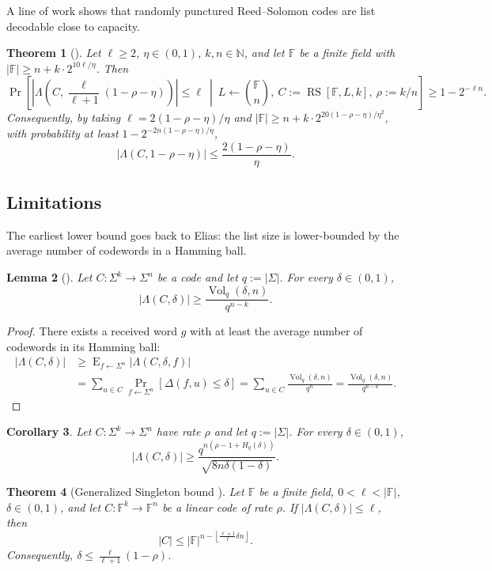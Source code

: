 \documentclass[11pt]{article}
\theoremstyle{plain}
\newtheorem{theorem}{Theorem}[section]
\newtheorem{lemma}[theorem]{Lemma}
\newtheorem{corollary}[theorem]{Corollary}
\theoremstyle{definition}
\newcommand{\F}{\mathbb{F}}
\newcommand{\N}{\mathbb{N}}
\newcommand{\RS}[3]{\operatorname{RS}[#1,#2,#3]}
\newcommand{\floor}[1]{\left\lfloor #1\right\rfloor}
\newcommand{\abs}[1]{\left|#1\right|}
\DeclareMathOperator{\Vol}{Vol}
\DeclareMathOperator*{\Prb}{Pr}
\DeclareMathOperator*{\E}{E}
\begin{document}
A line of work shows that randomly punctured Reed--Solomon codes are list decodable close to capacity.

\begin{theorem}[\cite{AGL24}]
Let $\ell\ge2$, $\eta\in(0,1)$, $k,n\in\N$, and let $\F$ be a finite field with $\abs{\F}\ge n+k\cdot 2^{10\ell/\eta}$. Then
\[
\Prb\left[
\left|\Lambda\left(C,\frac{\ell}{\ell+1}(1-\rho-\eta)\right)\right|\le \ell
\ \middle|\
 L\leftarrow \binom{\F}{n},\ C:=\RS{\F}{L}{k},\ \rho:=k/n
\right]
\ge 1-2^{-\ell n}.
\]
Consequently, by taking $\ell=2(1-\rho-\eta)/\eta$ and $\abs{\F}\ge n+k\cdot2^{20(1-\rho-\eta)/\eta^2}$, with probability at least $1-2^{-2n(1-\rho-\eta)/\eta}$,
\[
  \abs{\Lambda(C,1-\rho-\eta)}\le \frac{2(1-\rho-\eta)}{\eta}.
\]
\end{theorem}

\subsection{Limitations}

The earliest lower bound goes back to Elias: the list size is lower-bounded by the average number of codewords in a Hamming ball.

\begin{lemma}[\cite{Eli57}]
Let $C:\Sigma^k\to\Sigma^n$ be a code and let $q:=\abs{\Sigma}$. For every $\delta\in(0,1)$,
\[
  \abs{\Lambda(C,\delta)}\ge \frac{\Vol_q(\delta,n)}{q^{n-k}}.
\]
\end{lemma}

\begin{proof}
There exists a received word $g$ with at least the average number of codewords in its Hamming ball:
\[
\begin{aligned}
\abs{\Lambda(C,\delta)}
&\ge \E_{f\leftarrow\Sigma^n}\abs{\Lambda(C,\delta,f)} \\
&=\sum_{u\in C}\Prb_{f\leftarrow\Sigma^n}[\Delta(f,u)\le\delta]
=\sum_{u\in C}\frac{\Vol_q(\delta,n)}{q^n}
=\frac{\Vol_q(\delta,n)}{q^{n-k}}.
\end{aligned}
\]
\end{proof}

\begin{corollary}
Let $C:\Sigma^k\to\Sigma^n$ have rate $\rho$ and let $q:=\abs{\Sigma}$. For every $\delta\in(0,1)$,
\[
  \abs{\Lambda(C,\delta)}\ge
  \frac{q^{n(\rho-1+H_q(\delta))}}{\sqrt{8n\delta(1-\delta)}}.
\]
\end{corollary}

\begin{theorem}[Generalized Singleton bound \cite{ST20}]
Let $\F$ be a finite field, $0<\ell<\abs{\F}$, $\delta\in(0,1)$, and let $C:\F^k\to\F^n$ be a linear code of rate $\rho$. If $\abs{\Lambda(C,\delta)}\le\ell$, then
\[
  \abs{C}\le \abs{\F}^{n-\floor{\frac{\ell+1}{\ell}\delta n}}.
\]
Consequently, $\delta\le \frac{\ell}{\ell+1}(1-\rho)$.
\end{theorem}
\end{document}
